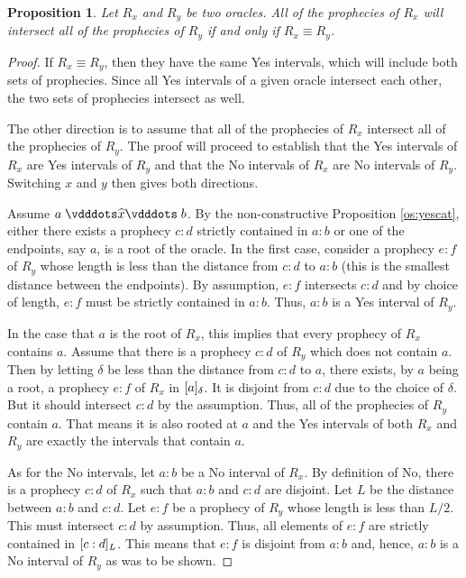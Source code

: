 \documentclass[12pt]{article}
\newtheorem{proposition}{Proposition}[section]
\begin{document}
 \begin{proposition}
Let $R_x$ and $R_y$ be two oracles. All of the prophecies of $R_x$ will intersect all of the prophecies of $R_y$ if and only if $R_x \equiv R_y$.
\end{proposition}

\begin{proof}\label{os:equal}
    If $R_x \equiv R_y$, then they have the same Yes intervals, which will include both sets of prophecies. Since all Yes intervals of a given oracle intersect each other, the two sets of prophecies intersect as well. 
    
    The other direction is to assume that all of the prophecies of $R_x$ intersect all of the prophecies of $R_y$. The proof will proceed to establish that the Yes intervals of $R_x$ are Yes intervals of $R_y$ and that the No intervals of $R_x$ are No intervals of $R_y$. Switching $x$ and $y$ then gives both directions.  

    Assume $a \xora b$. By the non-constructive Proposition \ref{os:yescat}, either there exists a prophecy $c:d$ strictly contained in $a:b$ or one of the endpoints, say $a$, is a root of the oracle. In the first case, consider a prophecy $e:f$ of $R_y$ whose length is less than the distance from $c:d$ to $a:b$ (this is the smallest distance between the endpoints). By assumption, $e:f$ intersects $c:d$ and by choice of length, $e:f$ must be strictly contained in $a:b$. Thus, $a:b$ is a Yes interval of $R_y$.

    In the case that $a$ is the root of $R_x$, this implies that every prophecy of $R_x$ contains $a$. Assume that there is a prophecy $c:d$ of $R_y$ which does not contain $a$. Then by letting $\delta$ be less than the distance from $c:d$ to $a$, there exists, by $a$ being a root, a prophecy $e:f$ of $R_x$ in $\halo{a}$. It is disjoint from $c:d$ due to the choice of $\delta$. But it should intersect $c:d$ by the assumption. Thus, all of the prophecies of $R_y$ contain $a$. That means it is also rooted at $a$  and the Yes intervals of both $R_x$ and $R_y$ are exactly the intervals that contain $a$. 
    
    As for the No intervals, let $a:b$ be a No interval of $R_x$. By definition of No, there is a prophecy $c:d$ of $R_x$ such that $a:b$ and $c:d$ are disjoint. Let $L$ be the distance between $a:b$ and $c:d$. Let $e:f$ be a prophecy of $R_y$ whose length is less than $L/2$. This must intersect $c:d$ by assumption. Thus, all elements of $e:f$ are strictly contained in $\halo[L]{c:d}$. This means that $e:f$ is disjoint from $a:b$ and, hence, $a:b$ is a No interval of $R_y$ as was to be shown. 
\end{proof} 
\end{document}
